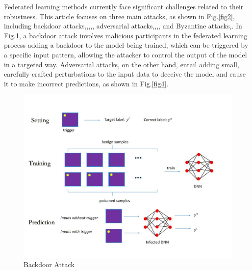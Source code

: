\documentclass[conference]{IEEEtran}
\begin{document}
Federated learning methods currently face significant challenges related to their robustness. This article focuses on three main attacks, as shown in Fig.\ref{fig2},
including backdoor attacks\cite{b24},\cite{b25},\cite{b26},\cite{b27},\cite{b28},
adversarial attacks\cite{b31},\cite{b32},\cite{b33},\cite{b34}, and Byzantine attacks\cite{b29},\cite{b30}.
In Fig.\ref{fig3}, a backdoor attack involves malicious participants in the federated
learning process adding a backdoor to the model being trained, which can be triggered by a specific input pattern,
allowing the attacker to control the output of the model in a targeted way. Adversarial attacks, on the other hand, entail adding small,
carefully crafted perturbations to the input data to deceive the model and cause it to make incorrect predictions\cite{b31},\cite{b32} as shown in Fig.\ref{fig4}.
\begin{figure}[htbp]
    \centerline{\includegraphics[width=0.8\linewidth,height=0.6\linewidth]{picture/f3.jpg}}
    \caption{Backdoor Attack}
    \label{fig3}
\end{figure}
\end{document}
